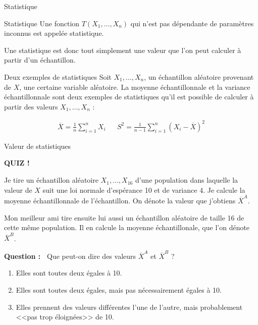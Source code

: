 \documentclass{BeamerTemplate}
\begin{document}
\begin{frame}{Statistique}
\begin{Boite}{Statistique}
    Une fonction $T(X_1,\hdots,X_n)$ qui n'est pas dépendante de paramètres inconnus est appelée \alert{statistique}.
\end{Boite}
    

    Une statistique est donc tout simplement une valeur que l'on peut calculer à partir d'un échantillon.


\end{frame}

\begin{frame}{Deux exemples de statistiques}
    Soit $X_1,\hdots,X_n$, un échantillon aléatoire provenant de $X$, une certaine variable aléatoire. La moyenne échantillonnale et la variance échantillonnale sont deux exemples de statistiques qu'il est possible de calculer à partir des valeurs $X_1,\dots,X_n$ :

    \begin{align*}
        \overline{X}=\frac{1}{n}\sum_{i=1}^n X_i & & S^2=\frac{1}{n-1}\sum_{i=1}^n(X_i-\overline{X})^2
    \end{align*}

    
\end{frame}

\begin{frame}[t]{Valeur de statistiques}
    
\centerline{\LARGE\bf\alert{QUIZ !}}

  \vspace{2mm}
  Je tire un échantillon aléatoire $X_1,\dots,X_{16}$ d'une population dans laquelle la valeur de $X$ suit une loi normale d'espérance
  10 et de variance 4. Je calcule la moyenne échantillonnale de l'échantillon. On dénote la valeur que j'obtiens $\overline{X}^A$.

  Mon meilleur ami tire ensuite lui aussi un échantillon aléatoire de taille 16 de cette même population. Il en calcule la moyenne échantillonale, que l'on dénote $\overline{X}^B$.

  {\bf Question :\ } Que peut-on dire des valeurs $\overline{X}^A$ et $\overline{X}^B$ ?
  \begin{enumerate}
      \item[(a)] Elles sont toutes deux égales à 10.
      \item[(b)] Elles sont toutes deux égales, mais pas nécessairement égales à 10.
      \item[(c)] Elles prennent des valeurs différentes l'une de l'autre, mais probablement <<pas trop éloignées>> de 10.
  \end{enumerate}
 \vspace{5cm}
\end{frame}
\end{document}
